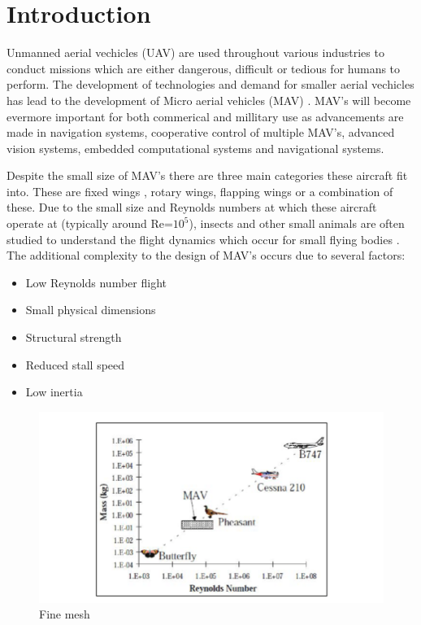 \graphicspath{{./Figs/}}

\chapter{Introduction} 
\label{sec:Background}



Unmanned aerial vechicles (UAV) are used throughout various industries to conduct missions which are either dangerous, difficult or tedious for humans to perform. The development of technologies and demand for smaller aerial vechicles has lead to the development of Micro aerial vehicles (MAV) \cite{NONAMI2007}. MAV's will become evermore important for both commerical \cite{Liu2014} and millitary \cite{Chaturvedi2019} \cite{Fan2018} use as advancements are made in navigation systems, cooperative control of multiple MAV's, advanced vision systems, embedded computational systems and navigational systems.

Despite the small size of MAV's there are three main categories these aircraft fit into. These are fixed wings \cite{Stanford2008} \cite{Lasek2001}, rotary wings, flapping wings\cite{Platzer2012} or a combination of these. Due to the small size and Reynolds numbers at which these aircraft operate at (typically around Re=$10^5$\cite{Huq2009}), insects and other small animals are often studied to understand the flight dynamics which occur for small flying bodies \cite{Liu2009}. The additional complexity to the design of MAV's occurs due to several factors:
\begin{itemize}
  \item Low Reynolds number flight
  \item Small physical dimensions
  \item Structural strength
  \item Reduced stall speed
  \item Low inertia
\end{itemize}

\begin{figure}[H]
  \centering
  \includegraphics[width=0.8\linewidth]{images/Reynolds.png}
  \caption{Fine mesh}
  \label{fig:MAVsizes}
\end{figure}

